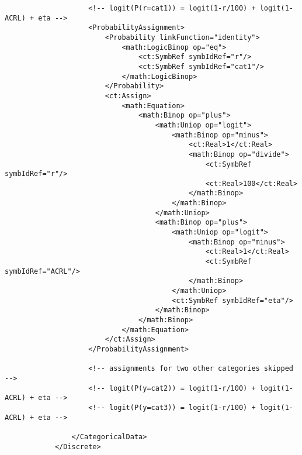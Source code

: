 \begin{lstlisting}
                    <!-- logit(P(r=cat1)) = logit(1-r/100) + logit(1-ACRL) + eta -->
                    <ProbabilityAssignment>
                        <Probability linkFunction="identity">
                            <math:LogicBinop op="eq">
                                <ct:SymbRef symbIdRef="r"/>
                                <ct:SymbRef symbIdRef="cat1"/>
                            </math:LogicBinop>
                        </Probability>
                        <ct:Assign>
                            <math:Equation>
                                <math:Binop op="plus">
                                    <math:Uniop op="logit">
                                        <math:Binop op="minus">
                                            <ct:Real>1</ct:Real>
                                            <math:Binop op="divide">
                                                <ct:SymbRef symbIdRef="r"/>
                                                <ct:Real>100</ct:Real>
                                            </math:Binop>
                                        </math:Binop>
                                    </math:Uniop>
                                    <math:Binop op="plus">
                                        <math:Uniop op="logit">
                                            <math:Binop op="minus">
                                                <ct:Real>1</ct:Real>
                                                <ct:SymbRef symbIdRef="ACRL"/>
                                            </math:Binop>
                                        </math:Uniop>
                                        <ct:SymbRef symbIdRef="eta"/>
                                    </math:Binop>
                                </math:Binop>
                            </math:Equation>
                        </ct:Assign>
                    </ProbabilityAssignment>
                    
                    <!-- assignments for two other categories skipped -->
                    <!-- logit(P(y=cat2)) = logit(1-r/100) + logit(1-ACRL) + eta -->
                    <!-- logit(P(y=cat3)) = logit(1-r/100) + logit(1-ACRL) + eta -->
                    
                </CategoricalData>
            </Discrete>
\end{lstlisting}
            
            

